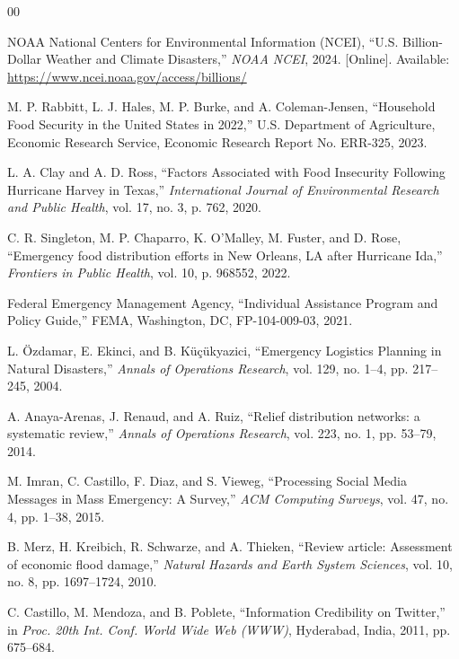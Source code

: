 \documentclass[conference]{IEEEtran}
\renewcommand{\_}{\origunderscore\allowbreak}
\begin{document}

\begin{thebibliography}{00}

NOAA National Centers for Environmental Information (NCEI),
``U.S. Billion-Dollar Weather and Climate Disasters,''
\textit{NOAA NCEI}, 2024.
[Online]. Available: \url{https://www.ncei.noaa.gov/access/billions/}

M. P. Rabbitt, L. J. Hales, M. P. Burke, and A. Coleman-Jensen,
``Household Food Security in the United States in 2022,''
U.S. Department of Agriculture, Economic Research Service,
Economic Research Report No. ERR-325, 2023.

L. A. Clay and A. D. Ross,
``Factors Associated with Food Insecurity Following Hurricane
Harvey in Texas,''
\textit{International Journal of Environmental Research and
Public Health}, vol. 17, no. 3, p. 762, 2020.

C. R. Singleton, M. P. Chaparro, K. O'Malley, M. Fuster, and D. Rose,
``Emergency food distribution efforts in New Orleans, LA after
Hurricane Ida,''
\textit{Frontiers in Public Health}, vol. 10, p. 968552, 2022.

Federal Emergency Management Agency,
``Individual Assistance Program and Policy Guide,''
FEMA, Washington, DC, FP-104-009-03, 2021.

L. \"{O}zdamar, E. Ekinci, and B. K\"{u}\c{c}\"{u}kyazici,
``Emergency Logistics Planning in Natural Disasters,''
\textit{Annals of Operations Research},
vol. 129, no. 1--4, pp. 217--245, 2004.

A. Anaya-Arenas, J. Renaud, and A. Ruiz,
``Relief distribution networks: a systematic review,''
\textit{Annals of Operations Research},
vol. 223, no. 1, pp. 53--79, 2014.

M. Imran, C. Castillo, F. Diaz, and S. Vieweg,
``Processing Social Media Messages in Mass Emergency: A Survey,''
\textit{ACM Computing Surveys}, vol. 47, no. 4, pp. 1--38, 2015.

B. Merz, H. Kreibich, R. Schwarze, and A. Thieken,
``Review article: Assessment of economic flood damage,''
\textit{Natural Hazards and Earth System Sciences},
vol. 10, no. 8, pp. 1697--1724, 2010.

C. Castillo, M. Mendoza, and B. Poblete,
``Information Credibility on Twitter,''
in \textit{Proc. 20th Int. Conf. World Wide Web (WWW)},
Hyderabad, India, 2011, pp. 675--684.


\end{thebibliography}
\end{document}
